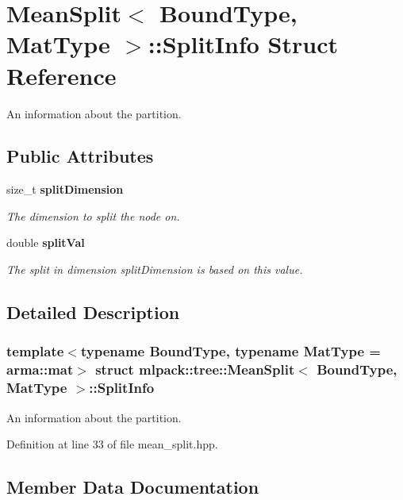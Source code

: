 \section{Mean\+Split$<$ Bound\+Type, Mat\+Type $>$\+:\+:Split\+Info Struct Reference}
\label{structmlpack_1_1tree_1_1MeanSplit_1_1SplitInfo}


An information about the partition.  


\subsection*{Public Attributes}
\begin{DoxyCompactItemize}
\item 
size\+\_\+t \textbf{ split\+Dimension}
\begin{DoxyCompactList}\small\item\em The dimension to split the node on. \end{DoxyCompactList}\item 
double \textbf{ split\+Val}
\begin{DoxyCompactList}\small\item\em The split in dimension split\+Dimension is based on this value. \end{DoxyCompactList}\end{DoxyCompactItemize}


\subsection{Detailed Description}
\subsubsection*{template$<$typename Bound\+Type, typename Mat\+Type = arma\+::mat$>$\newline
struct mlpack\+::tree\+::\+Mean\+Split$<$ Bound\+Type, Mat\+Type $>$\+::\+Split\+Info}

An information about the partition. 

Definition at line 33 of file mean\+\_\+split.\+hpp.



\subsection{Member Data Documentation}
\mbox{\label{structmlpack_1_1tree_1_1MeanSplit_1_1SplitInfo_a351b01278d3022d478536e0a84a1808e}} 
